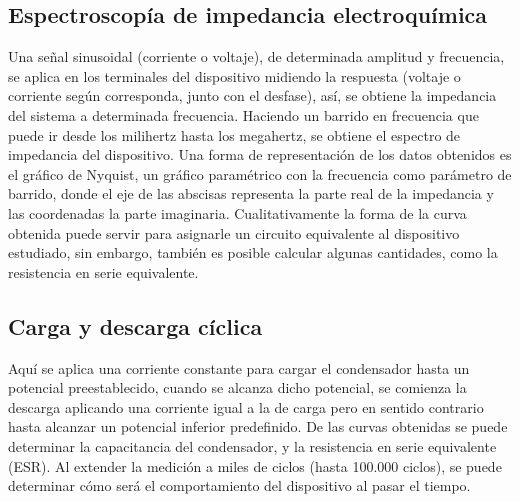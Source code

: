 \subsection{Espectroscopía de impedancia electroquímica}
Una señal sinusoidal (corriente o voltaje), de determinada amplitud y frecuencia, se aplica en los terminales del dispositivo midiendo la respuesta (voltaje o corriente según corresponda, junto con el desfase), así, se obtiene la impedancia del sistema a determinada frecuencia. Haciendo un barrido en frecuencia que puede ir desde los milihertz hasta los megahertz, se obtiene el espectro de impedancia del dispositivo. Una forma de representación de los datos obtenidos es el gráfico de Nyquist, un gráfico paramétrico con la frecuencia como parámetro de barrido, donde el eje de las abscisas representa la parte real de la impedancia y las coordenadas la parte imaginaria. Cualitativamente la forma de la curva obtenida puede servir para asignarle un circuito equivalente al dispositivo estudiado, sin embargo, también es posible calcular algunas cantidades, como la resistencia en serie equivalente.

\subsection{Carga y descarga cíclica}
Aquí se aplica una corriente constante para cargar el condensador hasta un potencial preestablecido, cuando se alcanza dicho potencial, se comienza la descarga aplicando una corriente igual a la de carga pero en sentido contrario hasta alcanzar un potencial inferior predefinido. De las curvas obtenidas se puede determinar la capacitancia del condensador, y la resistencia en serie equivalente (ESR). Al extender la medición a miles de ciclos (hasta 100.000 ciclos), se puede determinar cómo será el comportamiento del dispositivo al pasar el tiempo.
